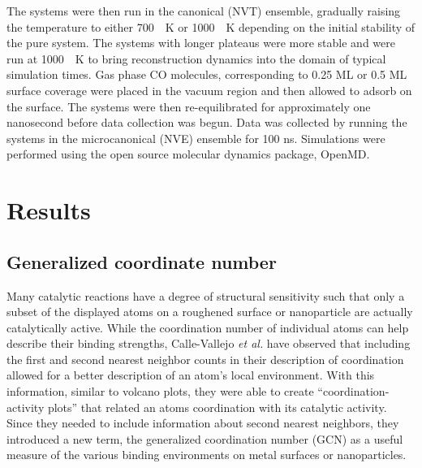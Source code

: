 The systems were then run in the canonical (NVT) ensemble, gradually raising
the temperature to either 700\ ~K or 1000\ ~K depending on the initial
stability of the pure system.  The systems with longer plateaus were more
stable and were run at 1000\ ~K to bring reconstruction dynamics into the
domain of typical simulation times.  Gas phase CO molecules, corresponding to
0.25 ML or 0.5 ML surface coverage were placed in the vacuum region and then
allowed to adsorb on the surface. The systems were then re-equilibrated for
approximately one nanosecond before data collection was begun.  Data was
collected by running the systems in the microcanonical (NVE) ensemble for 100
ns.  Simulations were performed using the open source molecular dynamics
package, OpenMD.\citep{Fennell:2006xq, Meineke:2005pt, openmd} 

\section{Results}


\subsection{Generalized coordinate number}
Many catalytic reactions have a degree of structural sensitivity such that only
a subset of the displayed atoms on a roughened surface or nanoparticle are
actually catalytically active. While the coordination number of individual
atoms can help describe their binding strengths, Calle-Vallejo {\it et al.}
have observed that including the first and second nearest neighbor counts in
their description of coordination allowed for a better description of an atom's
local environment.\citep{Calle-Vallejo:2015qq} With this information, similar to
volcano plots, they were able to create ``coordination-activity plots'' that
related an atoms coordination with its catalytic activity. Since they needed to
include information about second nearest neighbors, they introduced a new term,
the generalized coordination number (GCN) as a useful measure of the various
binding environments on metal surfaces or nanoparticles. 

